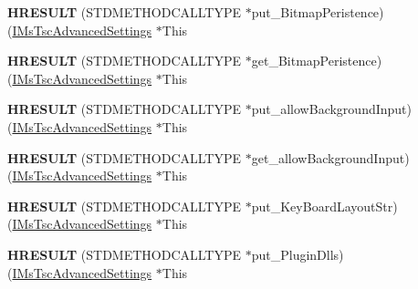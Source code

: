 \begin{DoxyCompactItemize}
{\bfseries H\+R\+E\+S\+U\+LT} (S\+T\+D\+M\+E\+T\+H\+O\+D\+C\+A\+L\+L\+T\+Y\+PE $\ast$put\+\_\+\+Bitmap\+Peristence)(\hyperlink{interface_m_s_t_s_c_lib_1_1_i_ms_tsc_advanced_settings}{I\+Ms\+Tsc\+Advanced\+Settings} $\ast$This
\item 
\mbox{\label{struct_m_s_t_s_c_lib_1_1_i_ms_tsc_advanced_settings_vtbl_a9c7e4fe2e3b1b8c0122120063934b0e5}} 
{\bfseries H\+R\+E\+S\+U\+LT} (S\+T\+D\+M\+E\+T\+H\+O\+D\+C\+A\+L\+L\+T\+Y\+PE $\ast$get\+\_\+\+Bitmap\+Peristence)(\hyperlink{interface_m_s_t_s_c_lib_1_1_i_ms_tsc_advanced_settings}{I\+Ms\+Tsc\+Advanced\+Settings} $\ast$This
\item 
\mbox{\label{struct_m_s_t_s_c_lib_1_1_i_ms_tsc_advanced_settings_vtbl_a2fae94c42f55734e716eb86f63592e30}} 
{\bfseries H\+R\+E\+S\+U\+LT} (S\+T\+D\+M\+E\+T\+H\+O\+D\+C\+A\+L\+L\+T\+Y\+PE $\ast$put\+\_\+allow\+Background\+Input)(\hyperlink{interface_m_s_t_s_c_lib_1_1_i_ms_tsc_advanced_settings}{I\+Ms\+Tsc\+Advanced\+Settings} $\ast$This
\item 
\mbox{\label{struct_m_s_t_s_c_lib_1_1_i_ms_tsc_advanced_settings_vtbl_ad0e529c91aa799e1c1b260e4e3539be3}} 
{\bfseries H\+R\+E\+S\+U\+LT} (S\+T\+D\+M\+E\+T\+H\+O\+D\+C\+A\+L\+L\+T\+Y\+PE $\ast$get\+\_\+allow\+Background\+Input)(\hyperlink{interface_m_s_t_s_c_lib_1_1_i_ms_tsc_advanced_settings}{I\+Ms\+Tsc\+Advanced\+Settings} $\ast$This
\item 
\mbox{\label{struct_m_s_t_s_c_lib_1_1_i_ms_tsc_advanced_settings_vtbl_a8f7804e9865cf47d14dd215efdb6199b}} 
{\bfseries H\+R\+E\+S\+U\+LT} (S\+T\+D\+M\+E\+T\+H\+O\+D\+C\+A\+L\+L\+T\+Y\+PE $\ast$put\+\_\+\+Key\+Board\+Layout\+Str)(\hyperlink{interface_m_s_t_s_c_lib_1_1_i_ms_tsc_advanced_settings}{I\+Ms\+Tsc\+Advanced\+Settings} $\ast$This
\item 
\mbox{\label{struct_m_s_t_s_c_lib_1_1_i_ms_tsc_advanced_settings_vtbl_a070f98e586e0a276f56b7dc4ee975afe}} 
{\bfseries H\+R\+E\+S\+U\+LT} (S\+T\+D\+M\+E\+T\+H\+O\+D\+C\+A\+L\+L\+T\+Y\+PE $\ast$put\+\_\+\+Plugin\+Dlls)(\hyperlink{interface_m_s_t_s_c_lib_1_1_i_ms_tsc_advanced_settings}{I\+Ms\+Tsc\+Advanced\+Settings} $\ast$This

\end{DoxyCompactItemize}

